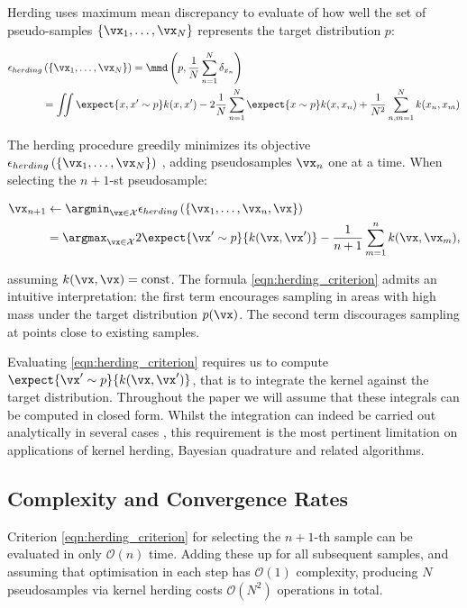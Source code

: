 Herding uses maximum mean discrepancy to evaluate of how well the set of pseudo-samples $\{\vx_1,\ldots,\vx_{N}\}$ represents the target distribution $p$:

\begin{align}
	\epsilon_{herding}&\left(\{\vx_1,\ldots,\vx_{N}\}\right) = \mmd\left(p,\frac{1}{N}\sum_{n=1}^{N}\delta_{x_n}\right)\\
	&=\iint \expect{x,x'\sim p} k(x,x') - 2 \frac{1}{N}\sum_{n=1}^{N} \expect{x\sim p}k(x,x_n)
		+ \frac{1}{N^2}\sum_{n,m=1}^{N} k(x_n,x_m)
\label{eq:mmd_assumption}
\end{align}

The herding procedure greedily minimizes its objective $\epsilon_{herding}\left(\{\vx_1,\ldots,\vx_{N}\}\right)$ , adding pseudosamples $\vx_n$ one at a time. When selecting the $n+1$-st pseudosample:

\begin{align}
\vx_{n+1} &\leftarrow \argmin_{\vx \in \mathcal{X}} \label{eqn:herding_criterion} \epsilon_{herding}\left(\{\vx_1,\ldots,\vx_{n},\vx\}\right)\\
	&= \argmax_{\vx \in \mathcal{X}} 2 \expect{\vx' \sim p}{k(\vx, \vx')} - \frac{1}{n+1}\sum_{m=1}^{n} k(\vx,\vx_m)\mbox{,}
\end{align}

assuming $k(\vx,\vx) = \mbox{const}$.
The formula \eqref{eqn:herding_criterion} admits an intuitive interpretation: the first term encourages sampling in areas with high mass under the target distribution $p(\vx)$. The second term discourages sampling at points close to existing samples. 

Evaluating \eqref{eqn:herding_criterion} requires us to compute $\expect{\vx' \sim p}{k(\vx, \vx')} $, that is to integrate the kernel against the target distribution. Throughout the paper we will assume that these integrals can be computed in closed form. Whilst the integration can indeed be carried out analytically in several cases \citep{Song2008,chen2010super}, this requirement is the most pertinent limitation on applications of kernel herding, Bayesian quadrature and related algorithms.

\subsection{Complexity and Convergence Rates}

Criterion \eqref{eqn:herding_criterion} for selecting the $n+1$-th sample can be evaluated in only $\mathcal{O}(n)$ time. Adding these up for all subsequent samples, and assuming that optimisation in each step has $\mathcal{O}(1)$ complexity, producing $N$ pseudosamples via kernel herding costs $\mathcal{O}(N^2)$ operations in total.

